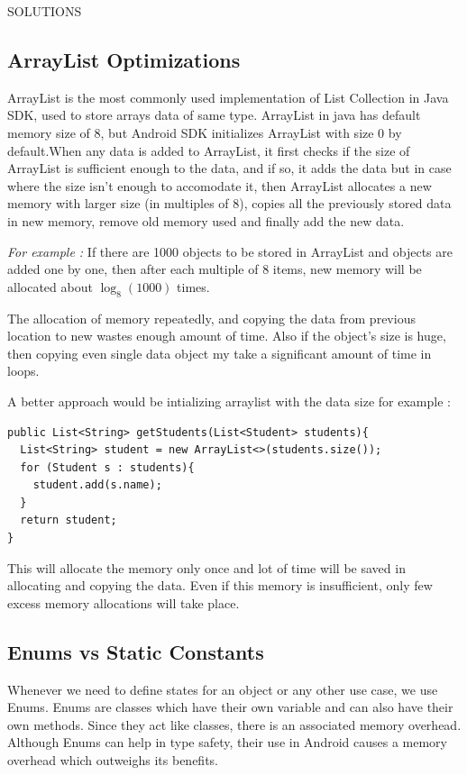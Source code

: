 \documentclass[journal]{IEEEtran}
\begin{document}
\newpage

\begin{center}
	SOLUTIONS
\end{center}

\subsection{ArrayList Optimizations}
ArrayList is the most commonly used implementation of List Collection in Java SDK, used to store arrays data of same type. ArrayList in java has default memory size of 8, but Android SDK initializes ArrayList with size 0 by default.When any data is added to ArrayList, it first checks if the size of ArrayList is sufficient enough to  the data, and if so, it adds the data but in case where the size isn't enough to accomodate it, then ArrayList allocates a new memory with larger size (in multiples of 8), copies all the previously stored data in new memory, remove old memory used and finally add the new data.

\emph{For example :} If there are 1000 objects to be stored in ArrayList and objects are added one by one, then after each multiple of 8 items, new memory will be allocated about $\log_8(1000)$ times.

The allocation of memory repeatedly, and copying the data from previous location to new wastes enough amount of time. Also if the object's size is huge, then copying even single data object my take a significant amount of time in loops.

A better approach would be intializing arraylist with the data size for example :

\begin{verbatim}
public List<String> getStudents(List<Student> students){
  List<String> student = new ArrayList<>(students.size());
  for (Student s : students){
    student.add(s.name);
  }
  return student;
}
\end{verbatim}
This will allocate the memory only once and lot of time will be saved in allocating and copying
the data. Even if this memory is insufficient, only few excess memory allocations will take place.


\subsection{Enums vs Static Constants}
Whenever we need to define states for an object or any other use case, we use Enums. Enums are classes which have their own variable and can also have their own methods. Since they act like classes, there is an associated memory overhead. Although Enums can help in type safety, their use in Android causes a memory overhead which outweighs its benefits.
\end{document}
